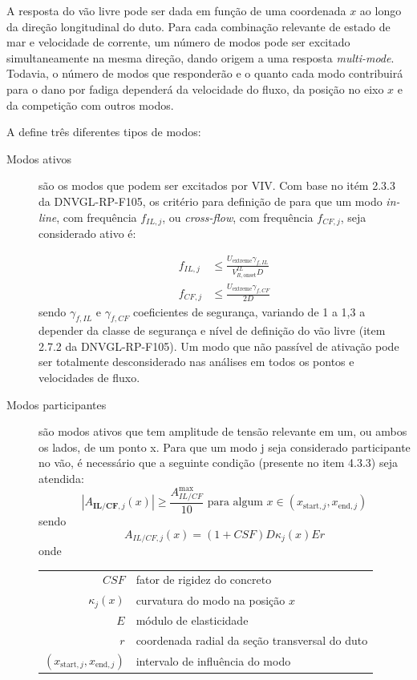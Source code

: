 A resposta do vão livre pode ser dada em função de uma coordenada $x$ ao longo da direção longitudinal do duto.
Para cada combinação relevante de estado de mar e velocidade de corrente, um número de modos pode ser excitado simultaneamente na mesma direção, dando origem a uma resposta \textit{multi-mode}.
Todavia, o número de modos que responderão e o quanto cada modo contribuirá para o dano por fadiga dependerá da velocidade do fluxo, da posição no eixo $x$ e da competição com outros modos.

A  define três diferentes tipos de modos:
\begin{description}
	\item[Modos ativos] são os modos que podem ser excitados por VIV. Com base no itém 2.3.3 da DNVGL-RP-F105, os critério para definição de para que um modo \textit{in-line}, com frequência $f_{IL,j}$, ou \textit{cross-flow}, com frequência $f_{CF,j}$, seja considerado ativo é:

    \begin{equation}
        \begin{aligned}
        f_{I L, j} & \leq \frac{U_{\text{extreme}} \gamma_{f,IL}}{V_{R,\text{onset}}^{IL} D} \\
        f_{C F, j} & \leq \frac{U_{\text{extreme}} \gamma_{f,CF}}{2D}
        \end{aligned}
    \end{equation}
    sendo $\gamma_{f,IL}$ e $\gamma_{f,CF}$ coeficientes de segurança, variando de 1 a 1,3 a depender da classe de segurança e nível de
    definição do vão livre (item 2.7.2 da DNVGL-RP-F105).
    Um modo que não passível de ativação pode ser totalmente desconsiderado nas análises em todos os pontos e velocidades de fluxo.

    \item[Modos participantes] são modos ativos que tem amplitude de tensão relevante em um, ou ambos os lados, de um ponto x. Para que um modo j seja considerado participante no vão, é necessário que a seguinte condição (presente no item 4.3.3) seja atendida:
    $$
    \left|A_{\textbf{IL/CF}, j}(x)\right| \geq \frac{A_{IL/CF}^{\max}}{10} \text{ para algum } x \in (x_{\text{start},j}, x_{\text{end}, j})
    $$
    sendo
    $$
    A_{IL/CF, j}(x) = (1+CSF) D \kappa_{j}(x) E r
    $$
    onde

    \begin{tabular}{rl}
        $\mathit{CSF}$                            & fator de rigidez do concreto\\
        $\kappa_{j}(x)$                           & curvatura do modo na posição $x$\\
        $E$                                       & módulo de elasticidade\\
        $r$                                       & coordenada radial da seção transversal do duto\\
        $(x_{\text{start},j}, x_{\text{end}, j})$ & intervalo de influência do modo
    \end{tabular}


\end{description}
